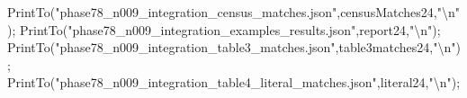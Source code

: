 \documentclass[
  10pt,
  letterpaper,
]{article}
\newenvironment{Shaded}{}{}
\newcommand{\BuiltInTok}[1]{\textcolor[rgb]{0.00,0.50,0.00}{#1}}
\newcommand{\NormalTok}[1]{#1}
\newcommand{\OperatorTok}[1]{\textcolor[rgb]{0.40,0.40,0.40}{#1}}
\newcommand{\StringTok}[1]{\textcolor[rgb]{0.25,0.44,0.63}{#1}}
\newcommand{\VariableTok}[1]{\textcolor[rgb]{0.10,0.09,0.49}{#1}}
\begin{document}
\begin{Shaded}
\begin{Highlighting}[]
\BuiltInTok{PrintTo}\NormalTok{(}\StringTok{"phase78\_n009\_integration\_census\_matches.json"}\OperatorTok{,}\VariableTok{censusMatches24}\OperatorTok{,}\StringTok{"\textbackslash{}n"}\NormalTok{)}\OperatorTok{;}
\BuiltInTok{PrintTo}\NormalTok{(}\StringTok{"phase78\_n009\_integration\_examples\_results.json"}\OperatorTok{,}\VariableTok{report24}\OperatorTok{,}\StringTok{"\textbackslash{}n"}\NormalTok{)}\OperatorTok{;}
\BuiltInTok{PrintTo}\NormalTok{(}\StringTok{"phase78\_n009\_integration\_table3\_matches.json"}\OperatorTok{,}\VariableTok{table3matches24}\OperatorTok{,}\StringTok{"\textbackslash{}n"}\NormalTok{)}\OperatorTok{;}
\BuiltInTok{PrintTo}\NormalTok{(}\StringTok{"phase78\_n009\_integration\_table4\_literal\_matches.json"}\OperatorTok{,}\VariableTok{literal24}\OperatorTok{,}\StringTok{"\textbackslash{}n"}\NormalTok{)}\OperatorTok{;}


\end{Highlighting}
\end{Shaded}
\end{document}
